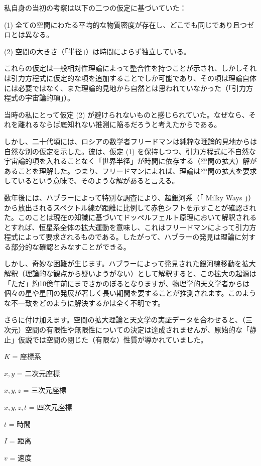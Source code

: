 \documentclass[a4paper,11pt,openany]{ltjsbook}
\begin{document}
私自身の当初の考察は以下の二つの仮定に基づいていた：

(1) 全ての空間にわたる平均的な物質密度が存在し、どこでも同じであり且つゼロとは異なる。

(2) 空間の大きさ（「半径」）は時間によらず独立している。

これらの仮定は一般相対性理論によって整合性を持つことが示され、しかしそれは引力方程式に仮定的な項を追加することでしか可能であり、その項は理論自体には必要ではなく、また理論的見地から自然とは思われていなかった（「引力方程式の宇宙論的項」）。

当時の私にとって仮定 (2) が避けられないものと感じられていた。なぜなら、それを離れるならば底知れない推測に陥るだろうと考えたからである。

しかし、二十代頃には、ロシアの数学者フリードマンは純粋な理論的見地からは自然な別の仮定を示した。彼は、仮定 (1) を保持しつつ、引力方程式に不自然な宇宙論的項を入れることなく「世界半径」が時間に依存する（空間の拡大）解があることを理解した。つまり、フリードマンによれば、理論は空間の拡大を要求しているという意味で、そのような解があると言える。

数年後には、ハブラーによって特別な調査により、超銀河系（「 Milky Ways 」）から放出されるスペクトル線が距離に比例して赤色シフトを示すことが確認された。このことは現在の知識に基づいてドッペルフェルト原理において解釈されるとすれば、恒星系全体の拡大運動を意味し、これはフリードマンによって引力方程式によって要求されるものである。したがって、ハブラーの発見は理論に対する部分的な確認とみなすことができる。

しかし、奇妙な困難が生じます。ハブラーによって発見された銀河線移動を拡大解釈（理論的な観点から疑いようがない）として解釈すると、この拡大の起源は「ただ」約10億年前にまでさかのぼるとなりますが、物理学的天文学者からは個々の星や星団の発展が著しく長い期間を要することが推測されます。このような不一致をどのように解決するかは全く不明です。

さらに付け加えます。空間の拡大理論と天文学の実証データを合わせると、（三次元）空間の有限性や無限性についての決定は達成されませんが、原始的な「静止」仮説では空間の閉じた（有限な）性質が導かれていました。

$K$ = 座標系

$x, y$ = 二次元座標

$x, y, z$ = 三次元座標

$x, y, z, t$ = 四次元座標

$t$ = 時間

$I$ = 距离

$v$ = 速度
\end{document}
